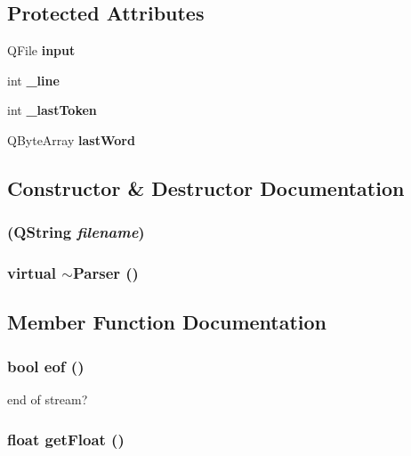 \subsection*{Protected Attributes}
\begin{CompactItemize}
\item 
QFile {\bf input}
\item 
int {\bf \_\-line}
\item 
int {\bf \_\-last\-Token}
\item 
QByte\-Array {\bf last\-Word}
\end{CompactItemize}


\subsection{Constructor \& Destructor Documentation}
\subsubsection{ (QString {\em filename})}\label{classParser_a0}


\subsubsection{\setlength{\rightskip}{0pt plus 5cm}virtual $\sim${\bf Parser} ()\hspace{0.3cm}{\tt  [inline, virtual]}}\label{classParser_a1}




\subsection{Member Function Documentation}
\subsubsection{\setlength{\rightskip}{0pt plus 5cm}bool eof ()}\label{classParser_a2}


end of stream? 

\subsubsection{\setlength{\rightskip}{0pt plus 5cm}float get\-Float ()}\label{classParser_a11}



